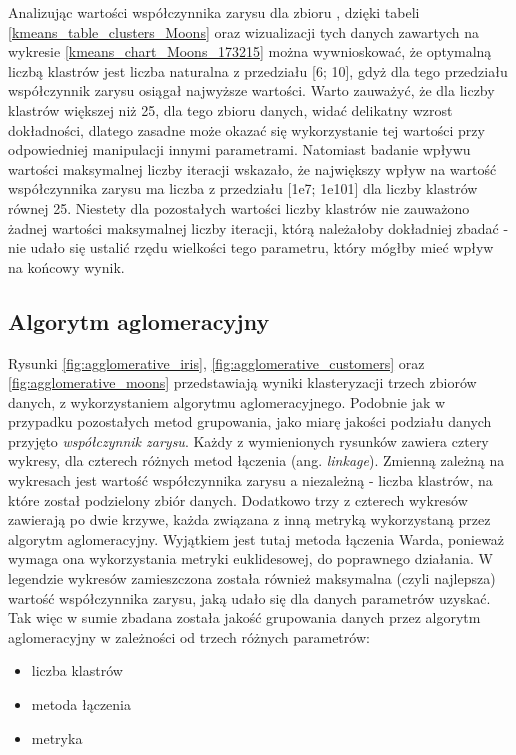 \documentclass{classrep}
\begin{document}
{{            Analizując wartości współczynnika zarysu dla zbioru \cite{dataset_moons},
            dzięki tabeli \ref{kmeans_table_clusters_Moons} oraz wizualizacji tych
            danych zawartych na wykresie \ref{kmeans_chart_Moons_173215} można
            wywnioskować, że optymalną liczbą klastrów jest liczba naturalna z przedziału [6;
            10], gdyż dla tego przedziału współczynnik zarysu osiągał najwyższe
            wartości. Warto zauważyć, że dla liczby klastrów większej niż 25, dla tego
            zbioru danych, widać delikatny wzrost dokładności, dlatego zasadne może
            okazać się wykorzystanie tej wartości przy odpowiedniej manipulacji innymi
            parametrami. Natomiast badanie wpływu wartości maksymalnej liczby iteracji
            wskazało, że największy wpływ na wartość współczynnika zarysu ma liczba z
            przedziału [1e7; 1e101] dla liczby klastrów równej 25. Niestety dla
            pozostałych wartości liczby klastrów nie zauważono żadnej wartości
            maksymalnej liczby iteracji, którą należałoby dokładniej zbadać - nie udało
            się ustalić rzędu wielkości tego parametru, który mógłby mieć wpływ na
            końcowy wynik.
            
        
        }

        \subsection{Algorytm aglomeracyjny}
        \label{summary_2} {
            Rysunki \ref{fig:agglomerative_iris}, \ref{fig:agglomerative_customers}
            oraz \ref{fig:agglomerative_moons} przedstawiają wyniki klasteryzacji
            trzech zbiorów danych, z wykorzystaniem algorytmu aglomeracyjnego. Podobnie
            jak w przypadku pozostałych metod grupowania, jako miarę jakości podziału
            danych przyjęto \emph{współczynnik zarysu}. Każdy z wymienionych rysunków
            zawiera cztery wykresy, dla czterech różnych metod łączenia (ang.
            \emph{linkage}). Zmienną zależną na wykresach jest wartość współczynnika
            zarysu a niezależną - liczba klastrów, na które został podzielony zbiór
            danych. Dodatkowo trzy z czterech wykresów zawierają po dwie krzywe, każda
            związana z inną metryką wykorzystaną przez algorytm aglomeracyjny.
            Wyjątkiem jest tutaj metoda łączenia Warda, ponieważ wymaga ona
            wykorzystania metryki euklidesowej, do poprawnego działania. W legendzie
            wykresów zamieszczona została również maksymalna (czyli najlepsza) wartość
            współczynnika zarysu, jaką udało się dla danych parametrów uzyskać. Tak
            więc w sumie zbadana została jakość grupowania danych przez algorytm
            aglomeracyjny w zależności od trzech różnych parametrów:
            \begin{itemize}
                \item liczba klastrów
                \item metoda łączenia
                \item metryka
            \end{itemize}

}}
\end{document}
